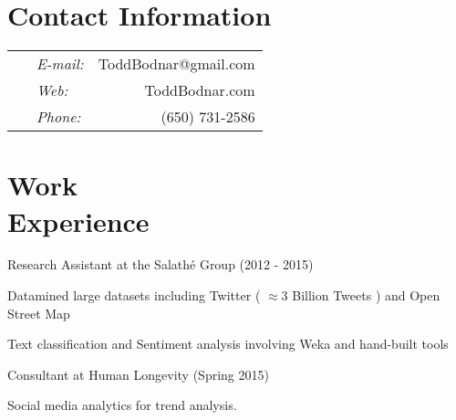 \documentclass[margin,line]{res}
\newenvironment{list1}{
  \begin{list}{\ding{113}}{%
      \setlength{\itemsep}{0in}
      \setlength{\parsep}{0in} \setlength{\parskip}{0in}
      \setlength{\topsep}{0in} \setlength{\partopsep}{0in} 
      \setlength{\leftmargin}{0.17in}}}{\end{list}}
\begin{document}

\begin{resume}
\section{\sc Contact Information}
\vspace{.05in}
\begin{tabular}{@{}p{3.7in}p{.5in} r }
\   &  {\it E-mail:}  & ToddBodnar@gmail.com \\         
\   &  {\it Web:}  & ToddBodnar.com \\
\  & {\it Phone:} & (650) 731-2586 \\
\end{tabular}


\section{\sc  Work \\ Experience}
Research Assistant at the Salath\'e Group (2012 - 2015)
\begin{list1}
\item[] Datamined large datasets including Twitter  ( \(\approx 3\) Billion Tweets ) and Open Street Map 
\item[] Text classification and Sentiment analysis involving Weka and hand-built tools
\end{list1}

Consultant at Human Longevity (Spring 2015)
\begin{list1}
\item[] Social media analytics for trend analysis. 
\end{list1}


\end{resume}
\end{document}
